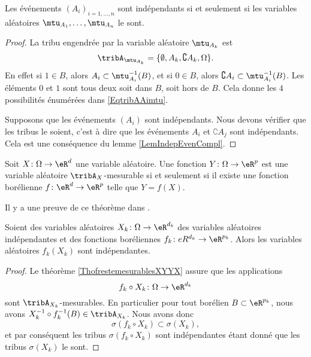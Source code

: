\begin{proposition}
    Les événements \( (A_i)_{i=1,\ldots,n}\) sont indépendants si et seulement si les variables aléatoires \( \mtu_{A_1},\ldots,\mtu_{A_n}\) le sont.
\end{proposition}

\begin{proof}
    La tribu engendrée par la variable aléatoire \( \mtu_{A_k}\) est
    \begin{equation}    \label{EqtribAAimtu}
        \tribA_{\mtu_{A_k}}=\{ \emptyset,A_k,\complement A_k,\Omega \}.
    \end{equation}
    En effet si \( 1\in B\), alors \( A_i\subset\mtu_{A_i}^{-1}(B)\), et si \( 0\in B\), alors \( \complement A_i\subset\mtu_{A_i}^{-1}(B)\). Les éléments \( 0\) et \( 1\) sont tous deux soit dans \( B\), soit hors de \( B\). Cela donne les \( 4\) possibilités énumérées dans \eqref{EqtribAAimtu}.

    Supposons que les événements \( (A_i)\) sont indépendants. Nous devons vérifier que les tribus le soient, c'est à dire que les événements \( A_i\) et \( \complement A_j\) sont indépendants. Cela est une conséquence du lemme \ref{LemIndepEvenCompl}.
\end{proof}

\begin{theorem}[Doob]     \label{ThofrestemesurablesXYYX}
    Soit \( X\colon \Omega\to \eR^d\) une variable aléatoire. Une fonction \( Y\colon \Omega\to \eR^{p}\) est une variable aléatoire \( \tribA_X\)-mesurable si et seulement si il existe une fonction borélienne \( f\colon \eR^d\to \eR^{p}\) telle que \( Y=f(X)\).
\end{theorem}

Il y a une preuve de ce théorème dans \cite{ProbaDanielLi}.

\begin{proposition}
    Soient des variables aléatoires \( X_k\colon \Omega\to \eR^{d_k}\) des variables aléatoires indépendantes et des fonctions boréliennes \( f_k\colon eR^{d_k}\to \eR^{p_k}\). Alors les variables aléatoires \( f_k(X_k)\) sont indépendantes.
\end{proposition}

\begin{proof}
    Le théorème \ref{ThofrestemesurablesXYYX} assure que les applications
    \begin{equation}
        f_k\circ X_k\colon \Omega\to \eR^{d_k}
    \end{equation}
    sont \( \tribA_{X_k}\)-mesurables. En particulier pour tout borélien \( B\subset\eR^{p_k}\), nous avons \( X^{-1}_k\circ f^{-1}_k(B)\in\tribA_{X_k}\). Nous avons donc
    \begin{equation}
        \sigma(f_k\circ X_k)\subset\sigma(X_k),
    \end{equation}
    et par conséquent les tribus \( \sigma(f_k\circ X_k)\) sont indépendantes étant donné que les tribus \( \sigma(X_k)\) le sont.
\end{proof}

